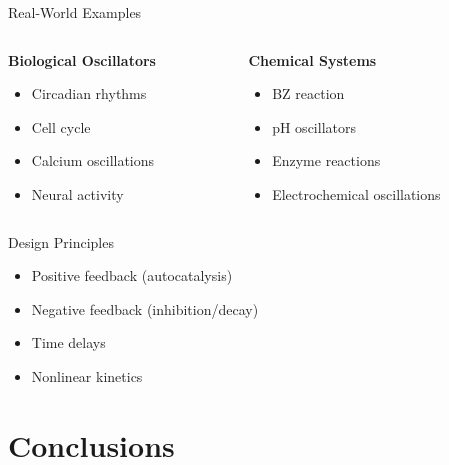 \documentclass{beamer}
\begin{document}
\begin{frame}{Real-World Examples}
\begin{columns}
\begin{column}{0.5\textwidth}
\textbf{Biological Oscillators}
\begin{itemize}
    \item Circadian rhythms
    \item Cell cycle
    \item Calcium oscillations
    \item Neural activity
\end{itemize}
\end{column}
\begin{column}{0.5\textwidth}
\textbf{Chemical Systems}
\begin{itemize}
    \item BZ reaction
    \item pH oscillators
    \item Enzyme reactions
    \item Electrochemical oscillations
\end{itemize}
\end{column}
\end{columns}

\vspace{0.5cm}
\begin{block}{Design Principles}
\begin{itemize}
    \item Positive feedback (autocatalysis)
    \item Negative feedback (inhibition/decay)
    \item Time delays
    \item Nonlinear kinetics
\end{itemize}
\end{block}
\end{frame}

\section{Conclusions}
\end{document}
